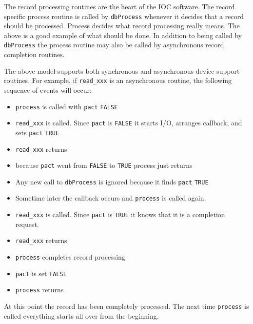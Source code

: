 The record processing routines are the heart of the IOC software.
The record specific process routine is called by \verb|dbProcess| whenever it decides that a record should be processed.
Process decides what record processing really means.
The above is a good example of what should be done.
In addition to being called by \verb|dbProcess| the process routine may also be called by asynchronous record completion routines.

The above model supports both synchronous and asynchronous device support routines.
For example, if \verb|read_xxx| is an asynchronous routine, the following sequence of events will occur:

\begin{itemize}
\item \verb|process| is called with \verb|pact| \verb|FALSE|

\item \verb|read_xxx| is called.
Since \verb|pact| is \verb|FALSE| it starts I/O, arranges callback, and sets \verb|pact| \verb|TRUE|

\item \verb|read_xxx| returns

\item because \verb|pact| went from \verb|FALSE| to \verb|TRUE| process just returns

\item Any new call to \verb|dbProcess| is ignored because it finds \verb|pact| \verb|TRUE|

\item Sometime later the callback occurs and \verb|process| is called again.

\item \verb|read_xxx| is called.
Since \verb|pact| is \verb|TRUE| it knows that it is a completion request.

\item \verb|read_xxx| returns

\item \verb|process| completes record processing

\item \verb|pact| is set \verb|FALSE|

\item \verb|process| returns

\end{itemize}

At this point the record has been completely processed.
The next time \verb|process| is called everything starts all over from the beginning.

